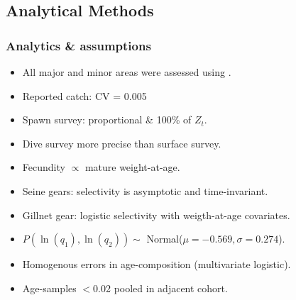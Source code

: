 \subsection{Analytical Methods} %
\label{sub:analytical_methods}
\begin{frame}[t]\frametitle{Analytics \& assumptions}
	\begin{itemize}
		\item<+-> All major and minor areas were assessed using  \iscam.
		\item<+-> Reported catch: CV = 0.005
		\item<+-> Spawn survey: proportional \& 100\% of $Z_t$.
		\item<+-> Dive survey more precise than surface survey.
		\item<+-> Fecundity $\propto$ mature weight-at-age.
		\item<+-> Seine gears: selectivity is asymptotic and time-invariant. 
		\item<+-|alert@+> Gillnet gear: logistic selectivity with weigth-at-age covariates.
		\item<+-|alert@+> $P(\ln(q_1),\ln(q_2)) \sim $ Normal($\mu=-0.569,\sigma=0.274$).
		\item<+-> Homogenous errors in age-composition (multivariate logistic).
		\item<+-> Age-samples $<$0.02 pooled in adjacent cohort.
	\end{itemize}
\end{frame}

